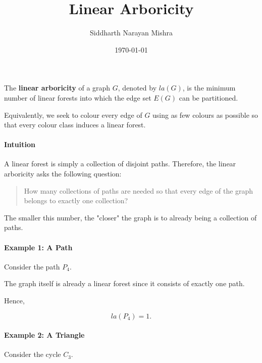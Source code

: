 \documentclass[11pt]{article}
\title{Linear Arboricity}
\author{Siddharth Narayan Mishra}
\date{\today}
\theoremstyle{plain}
\theoremstyle{definition}
\theoremstyle{remark}
\begin{document}
\maketitle

The \textbf{linear arboricity} of a graph $G$, denoted by $la(G)$, is the minimum number of linear forests into which the edge set $E(G)$ can be partitioned.

Equivalently, we seek to colour every edge of $G$ using as few colours as possible so that every colour class induces a linear forest.

\paragraph{Intuition}

A linear forest is simply a collection of disjoint paths. Therefore, the linear arboricity asks the following question:

\begin{quote}
How many collections of paths are needed so that every edge of the graph belongs to exactly one collection?
\end{quote}

The smaller this number, the "closer" the graph is to already being a collection of paths.

\paragraph{Example 1: A Path}

Consider the path $P_4$.

\begin{center}
\end{center}

The graph itself is already a linear forest since it consists of exactly one path.

Hence,

\[
la(P_4)=1.
\]

\paragraph{Example 2: A Triangle}

Consider the cycle $C_3$.
\end{document}
